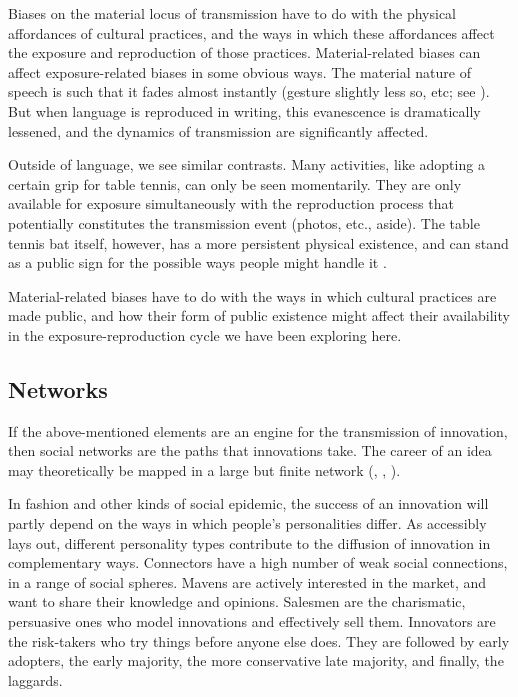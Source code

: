 Biases on the material locus of transmission have to do with the physical affordances of cultural practices, and the ways in which these affordances affect the exposure 
and reproduction of those practices. Material-related biases can affect exposure-related biases in some 
obvious ways. The material nature of speech is such that it fades almost instantly (gesture slightly less so, etc; see \citealt{enfield_anatomy_2009}).
But when language is reproduced in writing, this evanescence is dramatically lessened, and the 
dynamics of transmission are significantly affected. 



Outside of language, we see similar contrasts. Many activities, like adopting a certain grip for table tennis, can only be seen momentarily. They are 
only available for exposure simultaneously with the reproduction process 
that potentially constitutes the transmission event (photos, etc., 
aside). The table tennis bat itself, however, has a more persistent 
physical existence, and can stand as a public sign for the possible ways people might handle it \citep{norman_design_1988,kockelman_residence_2006}. 



Material-related biases have to do with the ways in which cultural practices are made public, and how their form of public existence might affect their availability in the 
exposure-reproduction cycle we have been exploring here.

\subsection{Networks}
If the above-mentioned elements are an engine for the transmission of innovation, then social networks are the paths that innovations take. The career of an idea may theoretically be mapped in a large but finite network (\citealt{luce_connectivity_1950}, \citealt[Chapter 12]{miller_language_1951}, \citealt{milroy_language_1980,ross_social_1997}). 

In fashion and other kinds of social epidemic, the success of an innovation will partly depend on the ways in which people's personalities differ. As \citet{gladwell_tipping_2000} accessibly lays out, different personality types contribute to the diffusion of innovation in complementary ways. Connectors have a high number of weak social connections, in a range of social spheres. Mavens are actively interested in the market, and want to share their knowledge and opinions. Salesmen are the charismatic, persuasive ones who model innovations and effectively sell them. Innovators are the risk-takers who try things before anyone else does. They are followed by early adopters, the early majority, the more conservative late majority, and finally, the laggards.

